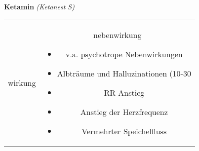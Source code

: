 \begin{frame}{
    \textbf{Ketamin}
    \textit{(Ketanest S)}
}
\begin{tabular}{c c}
\begin{beamercolorbox}[wd=\boxwidth\textwidth,ht=\boxheight\textheight,sep=1em]{wirkung}
        \end{beamercolorbox} & 
        \begin{beamercolorbox}[wd=\boxwidth\textwidth,ht=\boxheight\textheight,sep=1em]{nebenwirkung}
            \scriptsize
            \begin{itemize}
                \item v.a. psychotrope Nebenwirkungen
                \item Albträume und Halluzinationen (10-30%
                \item RR-Anstieg
                \item Anstieg der Herzfrequenz
                \item Vermehrter Speichelfluss
            \end{itemize}
        \end{beamercolorbox} \\
    \end{tabular}
\end{frame}

